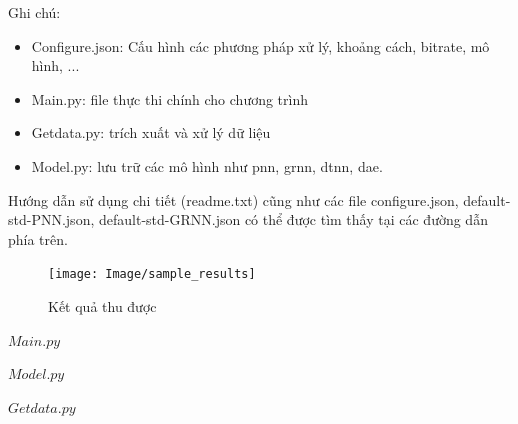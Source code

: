 \documentclass[12pt, a4paper, twoside]{report}
\begin{document}
Ghi chú:
\begin{itemize}
\item Configure.json: Cấu hình các phương pháp xử lý, khoảng cách, bitrate, mô hình, ...
\item Main.py: file thực thi chính cho chương trình
\item Getdata.py: trích xuất và xử lý dữ liệu
\item Model.py: lưu trữ các mô hình như \ac{pnn}, \ac{grnn}, \ac{dtnn}, \ac{dae}.
\end{itemize}
Hướng dẫn sử dụng chi tiết (readme.txt) cũng như các file configure.json, default-std-PNN.json, default-std-GRNN.json có thể được tìm thấy tại các đường dẫn phía trên. 
\begin{figure} [ht]
	\centering
	\captionsetup{justification=centering}
	\texttt{[image: Image/sample\_results]}
	\caption{Kết quả thu được}
	\label{fig:BER_20cm}
\end{figure}

\small
$Main.py$

$Model.py$

$Getdata.py$

\end{document}
